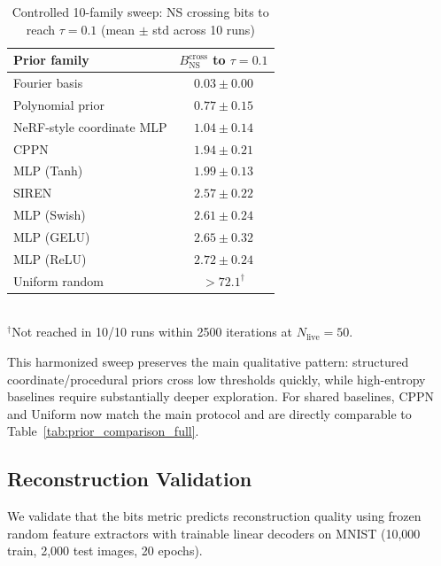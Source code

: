 \begin{table}[H]
\centering
\caption{Controlled 10-family sweep: NS crossing bits to reach $\tau=0.1$ (mean $\pm$ std across 10 runs)}
\label{tab:prior_family_sweep}
\begin{tabular}{lc}
\toprule
Prior family & $B_{\text{NS}}^{\text{cross}}$ to $\tau=0.1$ \\
\midrule
Fourier basis & $0.03 \pm 0.00$ \\
Polynomial prior & $0.77 \pm 0.15$ \\
NeRF-style coordinate MLP & $1.04 \pm 0.14$ \\
CPPN & $1.94 \pm 0.21$ \\
MLP (Tanh) & $1.99 \pm 0.13$ \\
SIREN & $2.57 \pm 0.22$ \\
MLP (Swish) & $2.61 \pm 0.24$ \\
MLP (GELU) & $2.65 \pm 0.32$ \\
MLP (ReLU) & $2.72 \pm 0.24$ \\
Uniform random & $>72.1^\dagger$ \\
\bottomrule
\end{tabular}
\\[2pt]
{\footnotesize $^\dagger$Not reached in 10/10 runs within 2500 iterations at $N_{\text{live}}=50$.}
\end{table}

This harmonized sweep preserves the main qualitative pattern: structured coordinate/procedural priors cross low thresholds quickly, while high-entropy baselines require substantially deeper exploration. For shared baselines, CPPN and Uniform now match the main protocol and are directly comparable to Table~\ref{tab:prior_comparison_full}.

\subsection{Reconstruction Validation}

We validate that the bits metric predicts reconstruction quality using frozen random feature extractors with trainable linear decoders on MNIST (10,000 train, 2,000 test images, 20 epochs).

